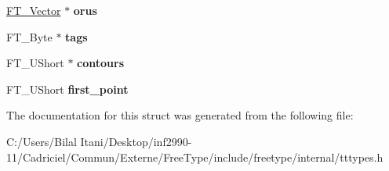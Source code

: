 \begin{DoxyCompactItemize}
\item 
\hyperlink{struct_f_t___vector__}{F\+T\+\_\+\+Vector} $\ast$ {\bfseries orus}\hypertarget{struct_t_t___glyph_zone_rec___a4b4193dbae177435cb6515f9a0537fa0}{}\label{struct_t_t___glyph_zone_rec___a4b4193dbae177435cb6515f9a0537fa0}

\item 
F\+T\+\_\+\+Byte $\ast$ {\bfseries tags}\hypertarget{struct_t_t___glyph_zone_rec___ae816c5c1096e333741d3f3f9d3ae0a8f}{}\label{struct_t_t___glyph_zone_rec___ae816c5c1096e333741d3f3f9d3ae0a8f}

\item 
F\+T\+\_\+\+U\+Short $\ast$ {\bfseries contours}\hypertarget{struct_t_t___glyph_zone_rec___ad16498cac0d4d233dce009eb74d63de1}{}\label{struct_t_t___glyph_zone_rec___ad16498cac0d4d233dce009eb74d63de1}

\item 
F\+T\+\_\+\+U\+Short {\bfseries first\+\_\+point}\hypertarget{struct_t_t___glyph_zone_rec___a9d655be80b3e31652f69ede54458faaf}{}\label{struct_t_t___glyph_zone_rec___a9d655be80b3e31652f69ede54458faaf}

\end{DoxyCompactItemize}


The documentation for this struct was generated from the following file\+:\begin{DoxyCompactItemize}
\item 
C\+:/\+Users/\+Bilal Itani/\+Desktop/inf2990-\/11/\+Cadriciel/\+Commun/\+Externe/\+Free\+Type/include/freetype/internal/tttypes.\+h\end{DoxyCompactItemize}

